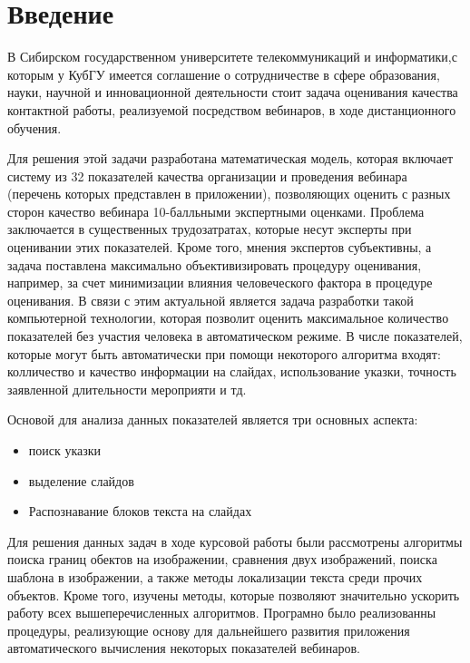 \documentclass[oneside,final,14pt]{extreport}
\begin{document}
\tableofcontents
\newpage
\chapter*{Введение}

	В Сибирском государственном университете телекоммуникаций и информатики,с которым у КубГУ имеется соглашение о сотрудничестве в сфере образования, науки, научной и инновационной деятельности стоит задача оценивания
качества контактной работы, реализуемой посредством вебинаров, в ходе дистанционного обучения. 

Для решения этой задачи разработана математическая модель, которая включает систему из 32 показателей качества организации и проведения вебинара (перечень которых представлен в приложении), позволяющих оценить с разных сторон  качество вебинара 10-балльными экспертными оценками. Проблема заключается в существенных трудозатратах, которые несут эксперты при оценивании этих показателей. Кроме того, мнения экспертов субъективны, а задача поставлена максимально объективизировать процедуру оценивания, например, за счет минимизации влияния человеческого фактора в процедуре оценивания. В связи с этим актуальной является  задача разработки такой компьютерной технологии, которая позволит оценить максимальное количество показателей без участия человека в автоматическом режиме. В числе показателей, которые могут быть автоматически при помощи некоторого алгоритма входят: колличество и качество информации на слайдах, использование указки, точность заявленной длительности мероприяти и тд.

Основой для анализа данных показателей является три основных аспекта:
\begin{itemize}[label= $-$, noitemsep]
\item поиск указки
\item выделение слайдов
\item Распознавание блоков текста на слайдах
\end{itemize}
 
Для решения данных задач в ходе курсовой работы были рассмотрены алгоритмы поиска границ обектов на изображении, сравнения двух изображений, поиска шаблона в изображении, а также методы локализации текста среди прочих объектов. Кроме того, изучены методы, которые позволяют значительно ускорить работу всех вышеперечисленных алгоритмов. Програмно было реализованны процедуры, реализующие основу для дальнейшего развития приложения автоматического вычисления некоторых показателей вебинаров. 
\end{document}
